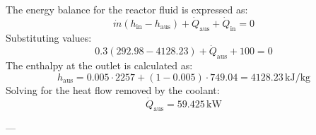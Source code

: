 The energy balance for the reactor fluid is expressed as:  
\[
\dot{m} \left( h_{\text{in}} - h_{\text{aus}} \right) + \dot{Q}_{\text{aus}} + \dot{Q}_{\text{in}} = 0
\]  
Substituting values:  
\[
0.3 \left( 292.98 - 4128.23 \right) + \dot{Q}_{\text{aus}} + 100 = 0
\]  
The enthalpy at the outlet is calculated as:  
\[
h_{\text{aus}} = 0.005 \cdot 2257 + (1 - 0.005) \cdot 749.04 = 4128.23 \, \text{kJ/kg}
\]  
Solving for the heat flow removed by the coolant:  
\[
\dot{Q}_{\text{aus}} = 59.425 \, \text{kW}
\]  

---